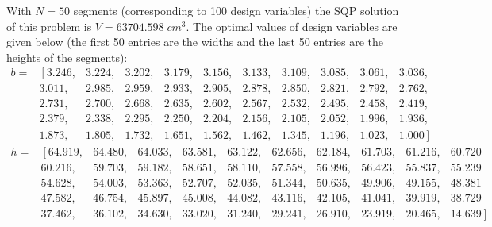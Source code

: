 \documentclass[runningheads,a4paper]{llncs}
\begin{document}
With $N=50$ segments (corresponding to 100 design variables) the SQP solution of this problem is $V = 63704.598\; cm^3$. The optimal values of design variables are given below (the first 50 entries are the widths and the last 50 entries are the heights of the segments):
\setcounter{MaxMatrixCols}{11}
\[
\begin{matrix}%
			b=& \left[3.246, \right.& 3.224,& 3.202,& 3.179,& 3.156,& 3.133,& 3.109,& 3.085,& 3.061,& 3.036,  \\  
			  & 3.011,& 2.985,& 2.959,& 2.933,& 2.905,& 2.878,& 2.850,& 2.821,& 2.792,& 2.762, \\
			  & 2.731,& 2.700,& 2.668,& 2.635,& 2.602,& 2.567,& 2.532,& 2.495,& 2.458,& 2.419, \\  
			  & 2.379,& 2.338,& 2.295,& 2.250,& 2.204,& 2.156,& 2.105,& 2.052,& 1.996,& 1.936, \\  
			  & 1.873,& 1.805,& 1.732,& 1.651,& 1.562,& 1.462,& 1.345,& 1.196,& 1.023,& \left. 1.000\right] 	
\end{matrix}
\]
\[
\begin{matrix}
	h=& \left[64.919,\right.&64.480,&64.033,&63.581,&63.122,&62.656,&62.184,&61.703,&61.216,&60.720  \\
		& 60.216,&59.703,&59.182,&58.651,&58.110,&57.558,&56.996,&56.423,&55.837,&55.239  \\
		& 54.628,&54.003,&53.363,&52.707,&52.035,&51.344,&50.635,&49.906,&49.155,&48.381  \\
		& 47.582,&46.754,&45.897,&45.008,&44.082,&43.116,&42.105,&41.041,&39.919,&38.729  \\
		& 37.462,&36.102,&34.630,&33.020,&31.240,&29.241,&26.910,&23.919,&20.465,&\left.14.639 \right]
\end{matrix}
\]
\end{document}
